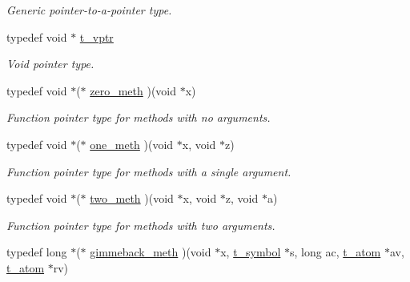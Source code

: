 \begin{DoxyCompactItemize}
\begin{DoxyCompactList}\small\item\em Generic pointer-\/to-\/a-\/pointer type. \item\end{DoxyCompactList}\item 
\hypertarget{group__datatypes_ga38df0c7504dc66f6dde187ac80a4db4a}{
typedef void $\ast$ \hyperlink{group__datatypes_ga38df0c7504dc66f6dde187ac80a4db4a}{t\_\-vptr}}
\label{group__datatypes_ga38df0c7504dc66f6dde187ac80a4db4a}

\begin{DoxyCompactList}\small\item\em Void pointer type. \item\end{DoxyCompactList}\item 
\hypertarget{group__datatypes_ga8dc4a45d1f82a212ce2ef921ab611fca}{
typedef void $\ast$($\ast$ \hyperlink{group__datatypes_ga8dc4a45d1f82a212ce2ef921ab611fca}{zero\_\-meth} )(void $\ast$x)}
\label{group__datatypes_ga8dc4a45d1f82a212ce2ef921ab611fca}

\begin{DoxyCompactList}\small\item\em Function pointer type for methods with no arguments. \item\end{DoxyCompactList}\item 
\hypertarget{group__datatypes_gacea7b6123eca3526399891715d3a66db}{
typedef void $\ast$($\ast$ \hyperlink{group__datatypes_gacea7b6123eca3526399891715d3a66db}{one\_\-meth} )(void $\ast$x, void $\ast$z)}
\label{group__datatypes_gacea7b6123eca3526399891715d3a66db}

\begin{DoxyCompactList}\small\item\em Function pointer type for methods with a single argument. \item\end{DoxyCompactList}\item 
\hypertarget{group__datatypes_gac6d2d64c03de780f1379287c5671ef9c}{
typedef void $\ast$($\ast$ \hyperlink{group__datatypes_gac6d2d64c03de780f1379287c5671ef9c}{two\_\-meth} )(void $\ast$x, void $\ast$z, void $\ast$a)}
\label{group__datatypes_gac6d2d64c03de780f1379287c5671ef9c}

\begin{DoxyCompactList}\small\item\em Function pointer type for methods with two arguments. \item\end{DoxyCompactList}\item 
\hypertarget{group__datatypes_ga98b3e62162a5a33fc823a88d27b50e2a}{
typedef long $\ast$($\ast$ \hyperlink{group__datatypes_ga98b3e62162a5a33fc823a88d27b50e2a}{gimmeback\_\-meth} )(void $\ast$x, \hyperlink{structt__symbol}{t\_\-symbol} $\ast$s, long ac, \hyperlink{structt__atom}{t\_\-atom} $\ast$av, \hyperlink{structt__atom}{t\_\-atom} $\ast$rv)}
\label{group__datatypes_ga98b3e62162a5a33fc823a88d27b50e2a}


\end{DoxyCompactItemize}

